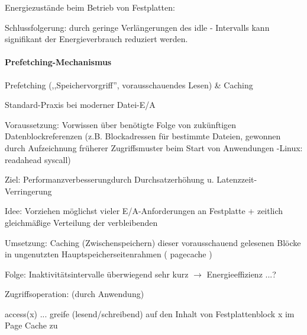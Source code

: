 \documentclass[a4paper]{article}
\begin{document}
\begin{multicols}{3}
    Energiezustände beim Betrieb von Festplatten:

    \begin{itemize*}
        \item
        \item
        Schlussfolgerung: durch geringe Verlängerungen des idle - Intervalls
        kann signifikant der Energieverbrauch reduziert werden.
    \end{itemize*}


    \paragraph{Prefetching-Mechanismus}

    \begin{itemize*}
        \item
        Prefetching (,,Speichervorgriff'', vorausschauendes Lesen) \& Caching
        \begin{itemize*}
            \item Standard-Praxis bei moderner Datei-E/A
            \item Voraussetzung: Vorwissen über benötigte Folge von zukünftigen Datenblockreferenzen (z.B. Blockadressen für bestimmte Dateien, gewonnen durch Aufzeichnung früherer Zugriffsmuster beim Start von Anwendungen -Linux: readahead syscall)
            \item Ziel: Performanzverbesserungdurch Durchsatzerhöhung u. Latenzzeit-Verringerung
            \item Idee: Vorziehen möglichst vieler E/A-Anforderungen an Festplatte + zeitlich gleichmäßige Verteilung der verbleibenden
            \item Umsetzung: Caching (Zwischenspeichern) dieser vorausschauend gelesenen Blöcke in ungenutzten Hauptspeicherseitenrahmen ( pagecache )
        \end{itemize*}
        \item
        Folge: Inaktivitätsintervalle überwiegend sehr kurz
        $\rightarrow$  Energieeffizienz ...?
        \item
        Zugriffsoperation: (durch Anwendung)
        \begin{itemize*}
            \item access(x) ... greife (lesend/schreibend) auf den Inhalt von Festplattenblock x im Page Cache zu
        \end{itemize*}
        \item

\end{itemize*}
\end{multicols}
\end{document}
